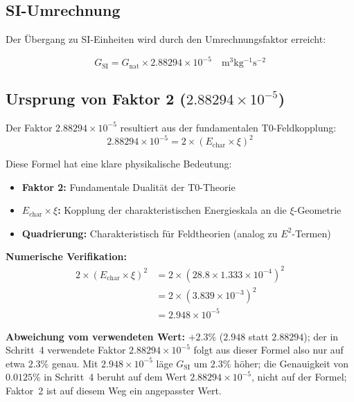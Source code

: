 	\subsection{SI-Umrechnung}
	
	Der Übergang zu SI-Einheiten wird durch den Umrechnungsfaktor erreicht:
	
	\begin{equation}
		\boxed{G_{\text{SI}} = G_{\text{nat}} \times 2.88294 \times 10^{-5} \quad \si{\meter^3 \kilogram^{-1} \second^{-2}}}
	\end{equation}
	
	\subsection{Ursprung von Faktor 2 ($2.88294 \times 10^{-5}$)}
	
	Der Faktor $2.88294 \times 10^{-5}$ resultiert aus der fundamentalen T0-Feldkopplung:
	\begin{equation}
		\boxed{2.88294 \times 10^{-5} = 2 \times (E_{\text{char}} \times \xi)^2}
	\end{equation}
	
	Diese Formel hat eine klare physikalische Bedeutung:
	\begin{itemize}
		\item \textbf{Faktor 2:} Fundamentale Dualität der T0-Theorie
		\item \textbf{$E_{\text{char}} \times \xi$:} Kopplung der charakteristischen Energieskala an die $\xi$-Geometrie
		\item \textbf{Quadrierung:} Charakteristisch für Feldtheorien (analog zu $E^2$-Termen)
	\end{itemize}
	
	\textbf{Numerische Verifikation:}
	\begin{align}
		2 \times (E_{\text{char}} \times \xi)^2 &= 2 \times (28.8 \times 1.333 \times 10^{-4})^2 \\
		&= 2 \times (3.839 \times 10^{-3})^2 \\
		&= 2.948 \times 10^{-5}
	\end{align}
	
	\textbf{Abweichung vom verwendeten Wert:} $+2.3\%$ ($2.948$ statt $2.88294$); der in Schritt~4 verwendete Faktor $2.88294 \times 10^{-5}$ folgt aus dieser Formel also nur auf etwa $2.3\%$ genau. Mit $2.948 \times 10^{-5}$ läge $G_{\text{SI}}$ um $2.3\%$ höher; die Genauigkeit von $0.0125\%$ in Schritt~4 beruht auf dem Wert $2.88294 \times 10^{-5}$, nicht auf der Formel; Faktor~2 ist auf diesem Weg ein angepasster Wert.
	

